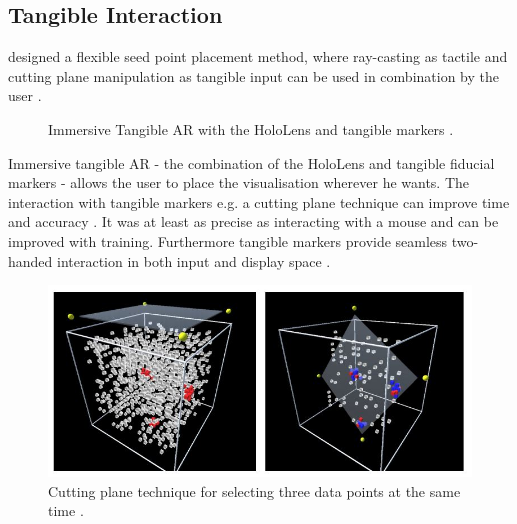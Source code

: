 \subsection{Tangible Interaction}
\label{subsection:TangibleInteraction}
\cite{Besancon2017} designed a flexible seed point placement method, where ray-casting as tactile and cutting plane manipulation as tangible input can be used in combination by the user \autocite[885]{Besancon2017}.
\begin{figure}[!ht]%
    \centering
    \qquad
    \caption{Immersive Tangible AR with the HoloLens and tangible markers \autocite{Bach2018}.}%
    \label{fig:ImmersiveAR}%
\end{figure}
\newline Immersive tangible \ac{AR} - the combination of the HoloLens and tangible fiducial markers - allows the user to place the visualisation wherever he wants. The interaction with tangible markers e.g. a cutting plane technique can improve time and accuracy \autocite[]{Bach2018}. It was at least as precise as interacting with a mouse and can be improved with training. Furthermore tangible markers provide seamless two-handed interaction in both input and display space \autocite[]{Billinghurst2008}.
 \begin{figure}[!ht]
    \centering
	\includegraphics[width=0.5 \textwidth]{images/Bach2018_CuttingPlane-jpg.JPG}
	\caption{
		Cutting plane technique for selecting three data points at the same time \autocite{Bach2018}.
	}
	\label{figure:CuttingPlane} 
\end{figure}

